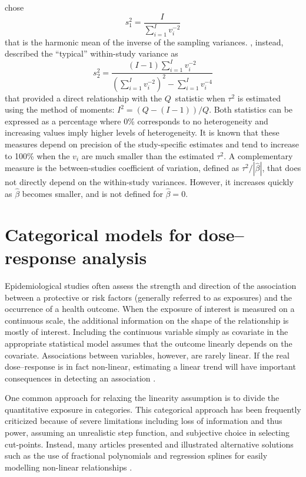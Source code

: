 \documentclass[11pt,a4paper,twoside,openany]{book}\usepackage{knitr}
\begin{document}
{\noindent \cite{takkouche1999evaluation} chose
\begin{equation}
s_1^2 = \frac{I}{\sum_{i=1}^I v_i^{-2}}
\label{eq:Ri}
\end{equation}
\noindent that is the harmonic mean of the inverse of the sampling variances. 
\cite{higgins2002quantifying}, instead, described the ``typical'' within-study variance as
\begin{equation}
s_2^2 = \frac{(I-1) \sum_{i=1}^I v_i^{-2}}{ \left( \sum_{i=1}^I v_i^{-2} \right)^2 - \sum_{i=1}^I v_i^{-4}}
\label{eq:I2}
\end{equation}
\noindent that provided a direct relationship with the $Q$~statistic when $\tau^2$ is estimated using the method of moments: $I^2 = (Q - (I-1))/Q$.
\noindent Both statistics can be expressed as a percentage where 0\% corresponds to no heterogeneity and increasing values imply higher levels of heterogeneity. It is known that these measures depend on precision of the study-specific estimates and tend to increase to 100\% when the $v_i$ are much smaller than the estimated $\tau^2$. 
A complementary measure is the between-studies coefficient of variation, defined as $\tau^2/|\hat \beta|$, that does not directly depend on the within-study variances. However, it increases quickly as $\hat \beta$ becomes smaller, and is not defined for $\hat \beta = 0$.



\section{Categorical models for dose--response analysis}

Epidemiological studies often assess the strength and direction of the association between a protective or risk factors (generally referred to as exposures) and the occurrence of a health outcome. When the exposure of interest is measured on a continuous scale, the additional information on the shape of the relationship is mostly of interest. Including the continuous variable simply as covariate in the appropriate statistical model assumes that the outcome linearly depends on the covariate. Associations between variables, however, are rarely linear. If the real dose--response is in fact non-linear, estimating a linear trend will have important consequences in detecting an association \citep{harrell2015regression}. 

\noindent One common approach for relaxing the linearity assumption is to divide the quantitative exposure in categories. This categorical approach has been frequently criticized because of severe limitations \citep{royston2006dichotomizing, greenland1995dose} including loss of information and thus power, assuming an unrealistic step function, and subjective choice in selecting cut-points. Instead, many articles presented and illustrated alternative solutions such as the use of fractional polynomials and regression splines for easily modelling non-linear relationships \citep{royston1999use, greenland1995avoiding}. 

}
\end{document}
